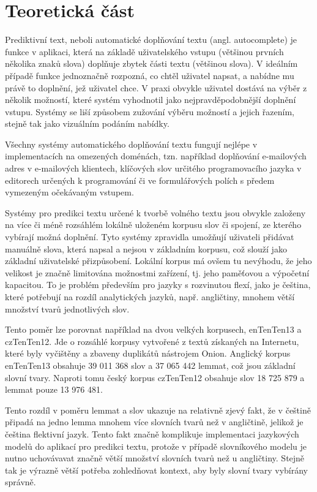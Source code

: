 \documentclass{article}
\begin{document}
\section{Teoretická část}

Prediktivní text, neboli automatické doplňování textu (angl. autocomplete) je funkce v aplikaci, která na základě uživatelského vstupu (většinou prvních několika znaků slova) doplňuje zbytek části textu (většinou slova). V ideálním případě funkce jednoznačně rozpozná, co chtěl uživatel napsat, a nabídne mu právě to doplnění, jež uživatel chce. V praxi obvykle uživatel dostává na výběr z několik možností, které systém vyhodnotil jako nejpravděpodobnější doplnění vstupu. Systémy se liší způsobem zužování výběru možností a jejich řazením, stejně tak jako vizuálním podáním nabídky.

Všechny systémy automatického doplňování textu fungují nejlépe v implementacích na omezených doménách, tzn. například doplňování e-mailových adres v e-mailových klientech, klíčových slov určitého programovacího jazyka v editorech určených k programování či ve formulářových polích s předem vymezeným očekávaným vstupem. 

Systémy pro predikci textu určené k tvorbě volného textu jsou obvykle založeny na více či méně rozsáhlém lokálně uloženém korpusu slov či spojení, ze kterého vybírají možná doplnění. Tyto systémy zpravidla umožňují uživateli přidávat manuálně slova, která napsal a nejsou v základním korpusu, což slouží jako základní uživatelské přizpůsobení. Lokální korpus má ovšem tu nevýhodu, že jeho velikost je značně limitována možnostmi zařízení, tj. jeho paměťovou a výpočetní kapacitou. To je problém především pro jazyky s rozvinutou flexí, jako je čeština, které potřebují na rozdíl analytických jazyků, např. angličtiny, mnohem větší množství tvarů jednotlivých slov. 

Tento poměr lze porovnat například na dvou velkých korpusech, enTenTen13 a czTenTen12. Jde o rozsáhlé korpusy vytvořené z textů získaných na Internetu, které byly vyčištěny a zbaveny duplikátů nástrojem Onion. Anglický korpus enTenTen13 obsahuje 39 011 368 slov a 37 065 442 lemmat, což jsou základní slovní tvary. Naproti tomu český korpus czTenTen12 obsahuje slov 18 725 879 a lemmat pouze 13 976 481. 


Tento rozdíl v poměru lemmat a slov ukazuje na relativně zjevý fakt, že v češtině připadá na jedno lemma mnohem více slovních tvarů než v angličtině, jelikož je čeština flektivní jazyk. Tento fakt značně komplikuje implementaci jazykových  modelů do aplikací pro predikci textu, protože v případě slovníkového modelu je nutno uchovávavat značně větší množství slovních tvarů než u angličtiny. Stejně tak je výrazně větší potřeba zohledňovat kontext, aby byly slovní tvary vybírány správně.
\end{document}

